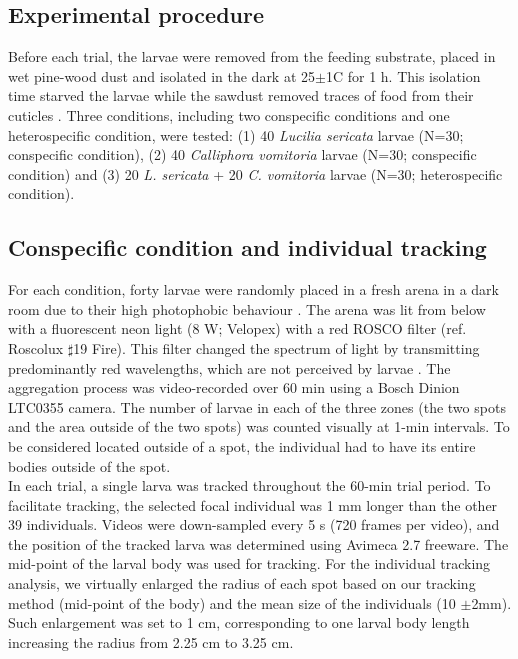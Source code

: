     
		\subsection{Experimental procedure}
Before each trial, the larvae were removed from the feeding substrate, placed in wet pine-wood dust and isolated in the dark at 25$\pm$1C for 1 h. This isolation time starved the larvae while the sawdust removed traces of food from their cuticles \cite{charabidze_discontinuous_2013}. Three conditions, including two conspecific conditions and one heterospecific condition, were tested: (1) 40 \textit{Lucilia sericata} larvae (N=30; conspecific condition), (2) 40 \textit{Calliphora vomitoria} larvae (N=30; conspecific condition) and (3) 20 \textit{L. sericata} + 20 \textit{C. vomitoria} larvae (N=30; heterospecific condition).


		\subsection{Conspecific condition and individual tracking}	
For each condition, forty larvae were randomly placed in a fresh arena in a dark room due to their high photophobic behaviour \cite{hinnemann_see_2010}. The arena was lit from below with a fluorescent neon light (8 W; Velopex) with a red ROSCO filter (ref. Roscolux $\sharp$19 Fire). This filter changed the spectrum of light by transmitting predominantly red wavelengths, which are not perceived by larvae \cite{hinnemann_see_2010}. The aggregation process was video-recorded over 60 min using a Bosch Dinion LTC0355 camera. The number of larvae in each of the three zones (the two spots and the area outside of the two spots) was counted visually at 1-min intervals. To be considered located outside of a spot, the individual had to have its entire bodies outside of the spot.\\
In each trial, a single larva was tracked throughout the 60-min trial period. To facilitate tracking, the selected focal individual was 1 mm longer than the other 39 individuals. Videos were down-sampled every 5 s (720 frames per video), and the position of the tracked larva was determined using Avimeca 2.7 freeware. The mid-point of the larval body was used for tracking. For the individual tracking analysis, we virtually enlarged the radius of each spot based on our tracking method (mid-point of the body) and the mean size of the individuals (10 $\pm$2mm). Such enlargement was set to 1 cm, corresponding to one larval body length increasing the radius from 2.25 cm to 3.25 cm.


